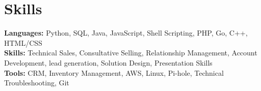 \documentclass[11pt]{article}       %
\begin{document}
\vspace{-18.5pt}


\section*{Skills}
\textbf{Languages:} Python, SQL, Java, JavaScript, Shell Scripting, PHP, Go, C++, HTML/CSS\\
\textbf{Skills:} Technical Sales, Consultative Selling, Relationship Management, Account Development, lead generation, Solution Design, Presentation Skills\\
\textbf{Tools:} CRM, Inventory Management, AWS, Linux, Pi-hole, Technical Troubleshooting, Git\\

\vspace{-6.5pt}
\end{document}
